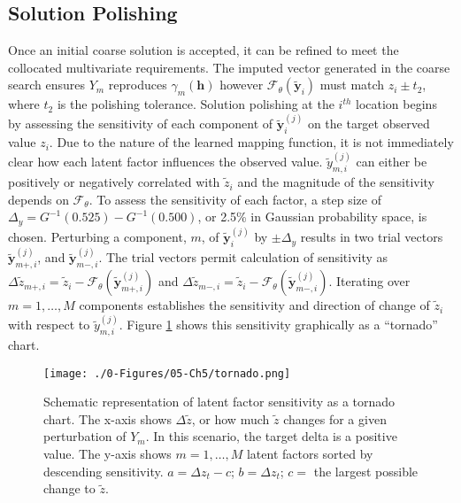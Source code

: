 \subsection{Solution Polishing}
\label{subsec:05polish}

Once an initial coarse solution is accepted, it can be refined to meet the collocated multivariate requirements. The imputed vector generated in the coarse search ensures $Y_{m}$ reproduces $\gamma_{m}(\mathbf{h})$ however $\mathcal{F}_{\theta}(\tilde{\mathbf{y}}_{i})$ must match $z_{i} \pm t_{2}$, where $t_{2}$ is the polishing tolerance. Solution polishing at the $i^{th}$ location begins by assessing the sensitivity of each component of  $\tilde{\mathbf{y}}_{i}^{(j)}$ on the target observed value $z_{i}$. Due to the nature of the learned mapping function, it is not immediately clear how each latent factor influences the observed value. $\tilde{y}_{m, i}^{(j)}$ can either be positively or negatively correlated with $\tilde{z}_{i}$ and the magnitude of the sensitivity depends on $\mathcal{F}_{\theta}$. To assess the sensitivity of each factor, a step size of $\Delta_{y} = G^{-1}(0.525)-G^{-1}(0.500)$, or 2.5\% in Gaussian probability space, is chosen. Perturbing a component, $m$, of $\tilde{\mathbf{y}}^{(j)}_{i}$ by $\pm \Delta_{y}$ results in two trial vectors $\tilde{\mathbf{y}}_{m+, i}^{(j)}$, and $\tilde{\mathbf{y}}_{m-,i}^{(j)}$. The trial vectors permit calculation of sensitivity as  $\Delta\tilde{z}_{m+,i} = \tilde{z}_{i} - \mathcal{F}_{\theta}(\tilde{\mathbf{y}}_{m+, i}^{(j)})$ and $\Delta\tilde{z}_{m-,i} = \tilde{z}_{i} - \mathcal{F}_{\theta}(\tilde{\mathbf{y}}_{m-,i}^{(j)})$. Iterating over $m=1,\dots,M$ components establishes the sensitivity and direction of change of $\tilde{z}_{i}$ with respect to $\tilde{y}_{m, i}^{(j)}$. Figure \ref{fig:tornado} shows this sensitivity graphically as a ``tornado'' chart.

\begin{figure}[htb!]
    \centering
    \texttt{[image: ./0-Figures/05-Ch5/tornado.png]}
    \caption{Schematic representation of latent factor sensitivity as a tornado chart. The x-axis shows $\Delta \tilde{z}$, or how much $\tilde{z}$ changes for a given perturbation of $Y_{m}$. In this scenario, the target delta is a positive value. The y-axis shows $m=1,\dots,M$ latent factors sorted by descending sensitivity. $a = \Delta z_{t} - c$; $b=\Delta z_{t}$; $c=$ the largest possible change to $\tilde{z}$.}
    \label{fig:tornado}
\end{figure}

